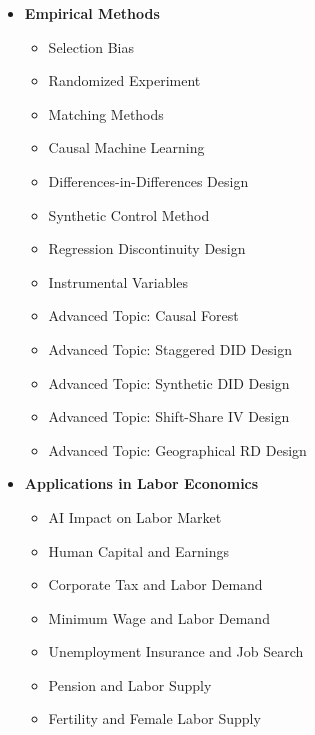 \documentclass[11pt]{article}
\begin{document}
\begin{itemize}
 \item[1] \textbf{Empirical Methods}
\begin{itemize}
\item Selection Bias
\item Randomized Experiment
\item Matching Methods
\item Causal Machine Learning
\item Differences-in-Differences Design
\item Synthetic Control Method
\item Regression Discontinuity Design
\item Instrumental Variables
\item Advanced Topic: Causal Forest
\item Advanced Topic: Staggered DID Design
\item Advanced Topic: Synthetic DID Design
\item Advanced Topic: Shift-Share IV Design
\item Advanced Topic: Geographical RD Design
\end{itemize}
 \item[2] \textbf{Applications in Labor Economics}
\begin{itemize}
\item AI Impact on Labor Market
\item Human Capital and Earnings
\item Corporate Tax and Labor Demand
\item Minimum Wage and Labor Demand
\item Unemployment Insurance and Job Search
\item Pension and Labor Supply
\item Fertility and Female Labor Supply
\end{itemize}

\end{itemize}
\end{document}
